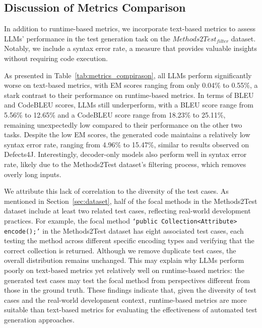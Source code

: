\subsection{Discussion of Metrics Comparison}
\label{sec:metrics_comparison}

In addition to runtime-based metrics, we incorporate text-based metrics to assess LLMs' performance in the test generation task on the $Methods2Test_{filter}$ dataset. Notably, we include a syntax error rate, a measure that provides valuable insights without requiring code execution.



As presented in Table~\ref{tab:metrics_compirason}, all LLMs perform significantly worse on text-based metrics, with EM scores ranging from only 0.04\% to 0.55\%, a stark contrast to their performance on runtime-based metrics. 
In terms of BLEU and CodeBLEU scores, LLMs still underperform, with a BLEU score range from 5.56\% to 12.65\% and a CodeBLEU score range from 18.23\% to 25.11\%, remaining unexpectedly low compared to their performance on the other two tasks.
Despite the low EM scores, the generated code maintains a relatively low syntax error rate, ranging from 4.96\% to 15.47\%, similar to results observed on Defects4J. Interestingly, decoder-only models also perform well in syntax error rate, likely due to the Methods2Test dataset’s filtering process, which removes overly long inputs.

We attribute this lack of correlation to the diversity of the test cases. As mentioned in Section~\ref{sec:dataset}, half of the focal methods in the Methods2Test dataset include at least two related test cases, reflecting real-world development practices. For example, the focal method \texttt{`public Collection<Attribute> encode();'} in the Methods2Test dataset has eight associated test cases, each testing the method across different specific encoding types and verifying that the correct collection is returned. 
Although we remove duplicate test cases, the overall distribution remains unchanged. This may explain why LLMs perform poorly on text-based metrics yet relatively well on runtime-based metrics: the generated test cases may test the focal method from perspectives different from those in the ground truth.
These findings indicate that, given the diversity of test cases and the real-world development context, runtime-based metrics are more suitable than text-based metrics for evaluating the effectiveness of automated test generation approaches.


